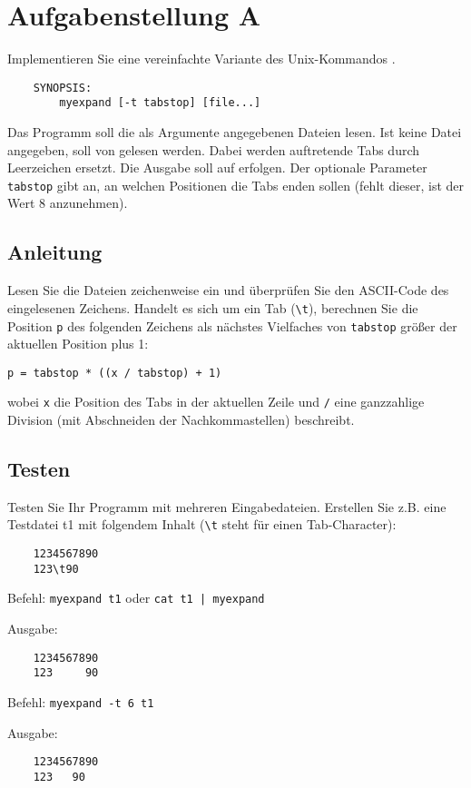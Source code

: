 




\section*{Aufgabenstellung A}
Implementieren Sie eine vereinfachte Variante des Unix-Kommandos
.
\begin{verbatim}
    SYNOPSIS:
        myexpand [-t tabstop] [file...]
\end{verbatim}

Das Programm  soll die als Argumente angegebenen Dateien
lesen. Ist keine Datei angegeben, soll von  gelesen werden.
Dabei werden auftretende Tabs durch Leerzeichen ersetzt. Die Ausgabe
soll auf  erfolgen. Der optionale Parameter \verb|tabstop|
gibt an, an welchen Positionen die Tabs enden sollen (fehlt dieser,
ist der Wert 8 anzunehmen).

\subsection*{Anleitung}
Lesen Sie die Dateien zeichenweise ein und überprüfen Sie den
ASCII-Code des eingelesenen Zeichens. Handelt es sich um ein Tab
(\verb|\t|), berechnen Sie die Position \verb|p| des folgenden
Zeichens als nächstes Vielfaches von \verb|tabstop| größer der
aktuellen Position plus 1:

\verb|p = tabstop * ((x / tabstop) + 1)|

wobei \verb|x| die Position des Tabs in der aktuellen Zeile und
\verb|/| eine ganzzahlige Division (mit Abschneiden der
Nachkommastellen) beschreibt.

\subsection*{Testen}
Testen Sie Ihr Programm mit mehreren Eingabedateien. Erstellen Sie
z.B. eine Testdatei t1 mit folgendem Inhalt (\verb|\t| steht für einen
Tab-Character):
\begin{verbatim}
	1234567890
	123\t90
\end{verbatim}

Befehl: \verb!myexpand t1! oder \verb!cat t1 | myexpand!

Ausgabe:
\begin{verbatim}
	1234567890
	123     90
\end{verbatim}

Befehl: \verb!myexpand -t 6 t1!

Ausgabe:
\begin{verbatim}
	1234567890
	123   90
\end{verbatim}

\osueguidelinesone


